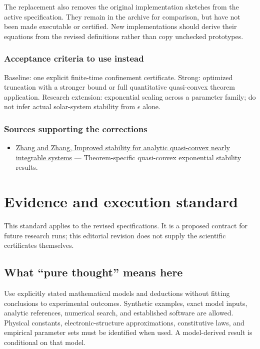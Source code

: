 \documentclass[
  11pt,
]{article}
\providecommand{\tightlist}{%
  \setlength{\itemsep}{0pt}\setlength{\parskip}{0pt}}
\begin{document}
The replacement also removes the original implementation sketches from
the active specification. They remain in the archive for comparison, but
have not been made executable or certified. New implementations should
derive their equations from the revised definitions rather than copy
unchecked prototypes.

\subsubsection{Acceptance criteria to use instead}

Baseline: one explicit finite-time confinement certificate. Strong:
optimized truncation with a stronger bound or full quantitative
quasi-convex theorem application. Research extension: exponential
scaling across a parameter family; do not infer actual solar-system
stability from \ensuremath{\epsilon} alone.

\subsubsection{Sources supporting the corrections}

\begin{itemize}
\tightlist
\item
  \href{https://arxiv.org/abs/1701.06026}{Zhang and Zhang, Improved
  stability for analytic quasi-convex nearly integrable systems} ---
  Theorem-specific quasi-convex exponential stability results.
\end{itemize}

\section{Evidence and execution standard}

This standard applies to the revised specifications. It is a proposed
contract for future research runs; this editorial revision does not
supply the scientific certificates themselves.

\subsection{What ``pure thought'' means here}

Use explicitly stated mathematical models and deductions without fitting
conclusions to experimental outcomes. Synthetic examples, exact model
inputs, analytic references, numerical search, and established software
are allowed. Physical constants, electronic-structure approximations,
constitutive laws, and empirical parameter sets must be identified when
used. A model-derived result is conditional on that model.
\end{document}
